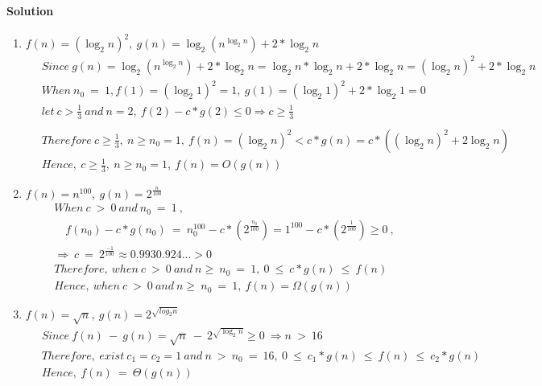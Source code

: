 \documentclass[a4paper]{scrartcl}
\begin{document}
\paragraph{Solution}
\begin{enumerate}[label=(\alph*)]
  \item $f(n)=\left(\log_2n\right)^2,\ g(n)=\log_2\left(n^{\log_2{n}}\right) + 2*\log_2{n}$
  \begin{align*}
  &\ Since\ g(n)= \log_2\left(n^{\log_2{n}}\right) + 2*\log_2{n} = \log_2{n}*\log_2{n} + 2*\log_2{n} = \left(\log_2{n}\right)^2 + 2*\log_2{n}\\ &\
  When\ n_0\ =\ 1, f(1) = (\log_2{1})^2 = 1,\ g(1) = \left(\log_2{1}\right)^2 + 2*\log_2{1} = 0\\ &\
  let\ c > \frac{1}{3}\ and\ n = 2,\ f(2)-c*g(2) \leq 0 \Rightarrow c \geq \frac{1}{3}\\ &\
  \end{align*}
  \begin{align*}
  &\ Therefore\ c\geq \frac{1}{3}, \ n \geq n_0 = 1,\ f(n)=\left(\log_2{n}\right)^2 < c*g(n) = c*(\left(\log_2{n}\right)^2 + 2\log_2{n})\\ &\
  Hence,\ c\geq \frac{1}{3}, \ n \geq n_0 = 1,\ f(n) = O(g(n))
  \end{align*}
  \item $f(n)= n^{100},\ g(n)=2^{\frac{n}{100}}$
  \begin{align*}
  &\ When\ c\ >\ 0\ and\ n_0\ = \ 1\ ,\\ &\
  \quad f(n_0) - c*g(n_0)\ =\ n_0^{100}-c*(2^\frac{n_0}{100})  = 1^{100}- c*(2^{\frac{1}{100}}) \geq 0\ ,\\ &\
  \Rightarrow\ c\ =\ 2^{\frac{-1}{100}} \approx 0.9930.924... > 0\\ &\
  Therefore,\ when\ c\ >\ 0\ and\ n \geq \ n_0\ = \ 1,\ 0\ \leq\ c*g(n)\ \leq\ f(n)\\ &\
  Hence, \ when\ c\ >\ 0\ and\ n \geq \ n_0\ = \ 1,\ f(n) = \Omega(g(n))
  \end{align*}
  \item $f(n)=\sqrt{n},\ g(n)=2^{\sqrt{log_2 n}}$
  \begin{align*}
  &\ Since\ f(n)\ -\ g(n)=\sqrt{n}\ -\ 2^{\sqrt{\log_2 n}} \geq 0\ \Rightarrow n\ >\ 16\\ &\
  Therefore,\ exist\ c_1=c_2=1\ and\ n\ >\ n_0\ =\ 16,\ 0\ \leq\ c_1*g(n)\ \leq\ f(n)\ \leq\ c_2*g(n)\\ &\
  Hence,\ f(n)\ =\ \Theta(g(n))

\end{align*}
\end{enumerate}
\end{document}
